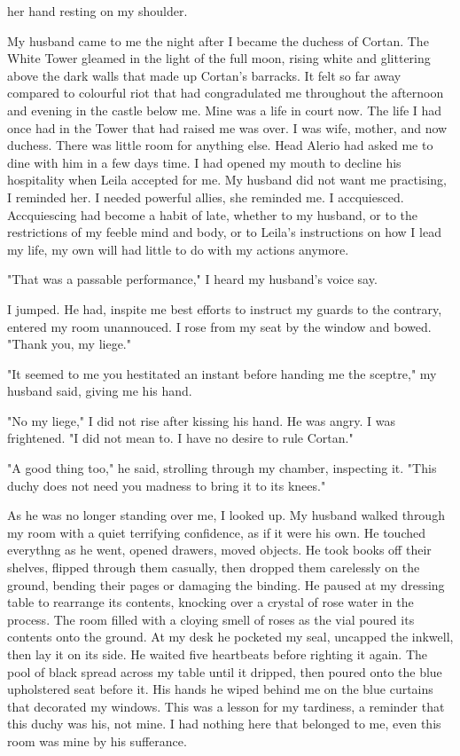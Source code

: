 \documentclass{article}
\begin{document}
her hand resting on my shoulder.

\vspace{.5cm}

My husband came to me the night after I became the duchess of Cortan. The White Tower gleamed in the light of the full moon, rising white and glittering above the dark walls that made up Cortan's barracks. It felt so far away compared to colourful riot that had congradulated me throughout the afternoon and evening in the castle below me. Mine was a life in court now. The life I had once had in the Tower that had raised me was over. I was wife, mother, and now duchess. There was little room for anything else. Head Alerio had asked me to dine with him in a few days time. I had opened my mouth to decline his hospitality when Leila accepted for me. My husband did not want me practising, I reminded her. I needed powerful allies, she reminded me. I accquiesced. Accquiescing had become a habit of late, whether to my husband, or to the restrictions of my feeble mind and body, or to Leila's instructions on how I lead my life, my own will had little to do with my actions anymore. 

"That was a passable performance," I heard my husband's voice say.

I jumped. He had, inspite me best efforts to instruct my guards to the contrary, entered my room unannouced. I rose from my seat by the window and bowed. "Thank you, my liege."

"It seemed to me you hestitated an instant before handing me the sceptre," my husband said, giving me his hand. 

"No my liege," I did not rise after kissing his hand. He was angry. I was frightened. "I did not mean to. I have no desire to rule Cortan."

"A good thing too," he said, strolling through my chamber, inspecting it. "This duchy does not need you madness to bring it to its knees."

As he was no longer standing over me, I looked up. My husband walked through my room with a quiet terrifying confidence, as if it were his own. He touched everythng as he went, opened drawers, moved objects. He took books off their shelves, flipped through them casually, then dropped them carelessly on the ground, bending their pages or damaging the binding. He paused at my dressing table to rearrange its contents, knocking over a crystal of rose water in the process. The room filled with a cloying smell of roses as the vial poured its contents onto the ground. At my desk he pocketed my seal, uncapped the inkwell, then lay it on its side. He waited five heartbeats before righting it again. The pool of black spread across my table until it dripped, then poured onto the blue upholstered seat before it. His hands he wiped behind me on the blue curtains that decorated my windows. This was a lesson for my tardiness, a reminder that this duchy was his, not mine. I had nothing here that belonged to me, even this room was mine by his sufferance.
\end{document}
